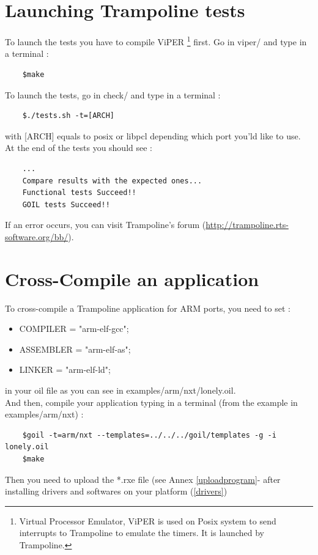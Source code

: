 \documentclass[10pt]{article}
\begin{document}
\newpage
\appendix
\section{Launching Trampoline tests} \label{tests}
To launch the tests you have to compile ViPER \footnote{Virtual Processor Emulator, ViPER is used on Posix system to send interrupts to Trampoline to emulate the timers. It is launched by Trampoline.} first. Go in viper/ and type in a terminal :
	\begin{verbatim}
	$make
	\end{verbatim}
To launch the tests, go in check/ and type in a terminal :
	\begin{verbatim}
	$./tests.sh -t=[ARCH]
	\end{verbatim}
with [ARCH] equals to posix or libpcl depending which port you'ld like to use.\\
At the end of the tests you should see :
	\begin{verbatim}
	...
	Compare results with the expected ones...
	Functional tests Succeed!!
	GOIL tests Succeed!!
	\end{verbatim}
If an error occurs, you can visit Trampoline's forum (\href{http://trampoline.rts-software.org/bb/}{http://trampoline.rts-software.org/bb/}).


\section{Cross-Compile an application} \label{compileanapplication}
To cross-compile a Trampoline application for ARM ports, you need to set  :
\begin{itemize}
\item COMPILER = "arm-elf-gcc";
\item ASSEMBLER = "arm-elf-as";
\item LINKER = "arm-elf-ld";
\end{itemize}
in your oil file as you can see in examples/arm/nxt/lonely.oil.\\
And then, compile your application typing in a terminal (from the example in examples/arm/nxt) :
	\begin{verbatim}
	$goil -t=arm/nxt --templates=../../../goil/templates -g -i lonely.oil
	$make
	\end{verbatim}
Then you need to upload the *.rxe file (see Annex \ref{uploadprogram}- after installing drivers and softwares on your platform (\ref{drivers})
\end{document}
